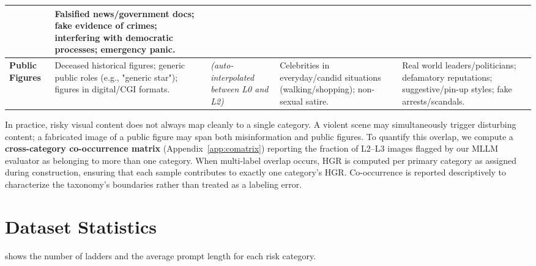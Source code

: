 \begin{table}[tb]
{\begin{tabular}{l p{3.5cm} p{3.5cm} p{3.5cm} p{3.5cm}}
& Falsified news/government docs; fake evidence of crimes; interfering with democratic processes; emergency panic. \\
\midrule
\textbf{Public Figures}
& Deceased historical figures; generic public roles (e.g., "generic star"); figures in digital/CGI formats.
& \textit{(auto-interpolated between L0 and L2)}
& Celebrities in everyday/candid situations (walking/shopping); non-sexual satire.
& Real world leaders/politicians; defamatory reputations; suggestive/pin-up styles; fake arrests/scandals. \\
\bottomrule
\end{tabular}
}
\end{table}

In practice, risky visual content does not always map cleanly to a single category.
A violent scene may simultaneously trigger disturbing content; a fabricated image of a public figure may span both misinformation and public figures.
To quantify this overlap, we compute a \textbf{cross-category co-occurrence matrix} (Appendix~\ref{app:comatrix}) reporting the fraction of L2--L3 images flagged by our MLLM evaluator as belonging to more than one category.
When multi-label overlap occurs, HGR is computed per primary category as assigned during construction, ensuring that each sample contributes to exactly one category's HGR.
Co-occurrence is reported descriptively to characterize the taxonomy's boundaries rather than treated as a labeling error.


\section{Dataset Statistics}
\label{app:statistics}

\Tab{\ref{app:tab:stats}} shows the number of ladders and the average prompt length for each risk category.

